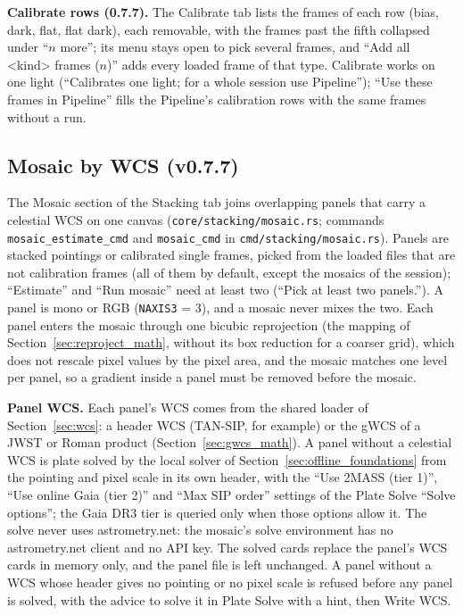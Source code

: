 \documentclass[11pt,a4paper]{article}
\newcommand{\code}[1]{\texttt{\small #1}}
\begin{document}
    \textbf{Calibrate rows (0.7.7).} The Calibrate tab lists the frames of each row (bias, dark, flat, flat dark), each removable, with the frames past the fifth collapsed under ``$n$ more''; its menu stays open to pick several frames, and ``Add all \textless{}kind\textgreater{} frames ($n$)'' adds every loaded frame of that type. Calibrate works on one light (``Calibrates one light; for a whole session use Pipeline''); ``Use these frames in Pipeline'' fills the Pipeline's calibration rows with the same frames without a run.

    \subsection{Mosaic by WCS (v0.7.7)}
    \label{sec:mosaic}

    The Mosaic section of the Stacking tab joins overlapping panels that carry a celestial WCS on one canvas (\code{core/\allowbreak stacking/\allowbreak mosaic.rs}; commands \code{mosaic\_estimate\_cmd} and \code{mosaic\_cmd} in \code{cmd/\allowbreak stacking/\allowbreak mosaic.rs}). Panels are stacked pointings or calibrated single frames, picked from the loaded files that are not calibration frames (all of them by default, except the mosaics of the session); ``Estimate'' and ``Run mosaic'' need at least two (``Pick at least two panels.''). A panel is mono or RGB (\code{NAXIS3} = 3), and a mosaic never mixes the two. Each panel enters the mosaic through one bicubic reprojection (the mapping of Section~\ref{sec:reproject_math}, without its box reduction for a coarser grid), which does not rescale pixel values by the pixel area, and the mosaic matches one level per panel, so a gradient inside a panel must be removed before the mosaic.

    \textbf{Panel WCS.} Each panel's WCS comes from the shared loader of Section~\ref{sec:wcs}: a header WCS (TAN-SIP, for example) or the gWCS of a JWST or Roman product (Section~\ref{sec:gwcs_math}). A panel without a celestial WCS is plate solved by the local solver of Section~\ref{sec:offline_foundations} from the pointing and pixel scale in its own header, with the ``Use 2MASS (tier 1)'', ``Use online Gaia (tier 2)'' and ``Max SIP order'' settings of the Plate Solve ``Solve options''; the Gaia DR3 tier is queried only when those options allow it. The solve never uses astrometry.net: the mosaic's solve environment has no astrometry.net client and no API key. The solved cards replace the panel's WCS cards in memory only, and the panel file is left unchanged. A panel without a WCS whose header gives no pointing or no pixel scale is refused before any panel is solved, with the advice to solve it in Plate Solve with a hint, then Write WCS.
\end{document}
